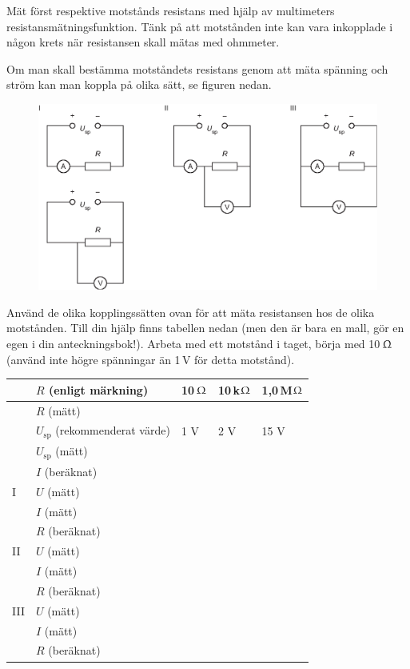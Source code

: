 \documentclass[a4paper,11pt]{article}
\begin{document}
Mät först respektive motstånds resistans med hjälp av 
multimeters resistansmätningsfunktion. Tänk på att motstånden inte kan vara
inkopplade i någon krets när resistansen skall mätas med ohmmeter. 

Om man skall bestämma motståndets resistans genom att mäta spänning och ström 
kan man koppla på olika sätt, se figuren nedan.

\begin{figure}[h]
	\centering
	\includegraphics{fig02.eps}
\end{figure}



Använd de olika kopplingssätten ovan för att mäta resistansen 
hos de olika motstånden. Till din hjälp finns tabellen nedan (men den är bara en
mall, gör en egen i din anteckningsbok!). Arbeta 
med ett motstånd i taget, börja med 10\,$\Upomega$ (använd inte 
högre spänningar än 1\,V för detta motstånd).

\begin{tabular}{|l|l|p{2cm}|p{2cm}|p{2cm}|}
	\hline
	& $R$ (enligt märkning) & 10\,$\Upomega$  & 10\,k$\Upomega$  & 1,0\,M$\Upomega$  \\
	\hline
	\hline
	& $R$ (mätt) &  &  &   \\
	\hline
	\hline
	& $U_{\text{sp}}$ (rekommenderat värde) & 1 V & 2 V & 15 V  \\
	\cline{2-5}
	& $U_{\text{sp}}$ (mätt) &   &   &    \\
	\cline{2-5}
	& $I$ (beräknat) &   &   &    \\
	\hline
	\hline
	I & $U$ (mätt) &   &   &    \\
	\cline{2-5}
	& $I$ (mätt) &   &   &    \\
	\cline{2-5}
	& $R$ (beräknat) &   &   &    \\
	\hline
	\hline
	II & $U$ (mätt) &   &   &    \\
	\cline{2-5}
	& $I$ (mätt) &   &   &    \\
	\cline{2-5}
	& $R$ (beräknat) &   &   &    \\
	\hline
	\hline
	III & $U$ (mätt) &   &   &    \\
	\cline{2-5}
	& $I$ (mätt) &   &   &    \\
	\cline{2-5}
	& $R$ (beräknat) &   &   &    \\
	\hline
\end{tabular} 
\end{document}
